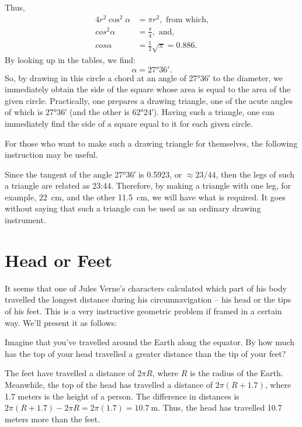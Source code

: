Thus,
\begin{align*}%
4r^{2} \cos^{2} \alpha & = \pi r^{2}, \,\, \text{from which,}\\
cos^{2} \alpha & = \frac{\pi}{4}, \,\, \text{and,} \\
cos \alpha & = \frac{1}{2} \sqrt{\pi} = 0.886.
\end{align*}
By looking up in the tables, we find:
\begin{equation*}%
\alpha = \ang{27;36}.
\end{equation*}
So, by drawing in this circle a chord at an angle of \ang{27;36} to the diameter, we immediately obtain the side of the square whose area is equal to the area of the given circle. Practically, one prepares a drawing triangle, one of the acute angles of which is \ang{27;36} (and the other is \ang{62;24}). Having such a triangle, one can immediately find the side of a square equal to it for each given circle.

For those who want to make such a drawing triangle for themselves, the following instruction may be useful.

Since the tangent of the angle \ang{27;36} is 0.5923, or $\approx 23/44$, then the legs of such a triangle are related as 23:44. Therefore, by making a triangle with one leg, for example, \SI{22}{\centi\meter}, and the other \SI{11.5}{\centi\meter}, we will have what is required. It goes without saying that such a triangle can be used as an ordinary drawing instrument.


\section{Head or Feet}
\label{sec-9.8}

It seems that one of Jules Verne's characters calculated which part of his body travelled the longest distance during his circumnavigation -- his head or the tips of his feet. This is a very instructive geometric problem if framed in a certain way. We'll present it as follows:


\ques Imagine that you've travelled around the Earth along the equator. By how much has the top of your head travelled a greater distance than the tip of your feet?


\ans The feet have travelled a distance of $2\pi R$, where $R$ is the radius of the Earth. Meanwhile, the top of the head has travelled a distance of $2\pi(R + 1.7)$, where 1.7 meters is the height of a person. The difference in distances is $2\pi(R + 1.7) - 2\pi R = 2\pi(1.7) = \SI{10.7}{\meter}$. Thus, the head has travelled 10.7 meters more than the feet.

